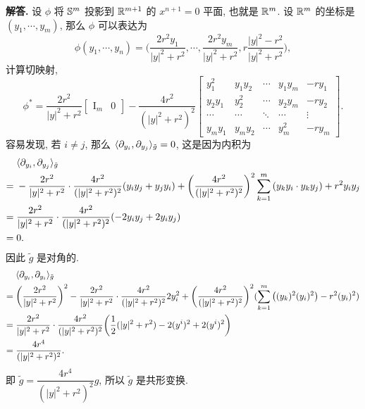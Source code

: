 \documentclass{ctexart}
\newenvironment{solution}{\par\noindent\textbf{解答. }}{\par}
\begin{document}
\begin{solution}
    设 $\phi$ 将 $\mathbb{S}^{m}$ 投影到 $\mathbb{R}^{m + 1}$ 的 $x^{n + 1} = 0$ 平面, 也就是 $\mathbb{R}^m$. 设 $\mathbb{R}^m$ 的坐标是 $(y_1, \cdots, y_m)$, 那么 $\phi$ 可以表达为
    \[
        \phi(y_1, \cdots, y_n) = \biggl( \dfrac{2r^2y_1}{|y|^2 + r^2}, \cdots, \dfrac{2r^2y_m}{|y|^2 + r^2}, r\dfrac{|y|^2 - r^2}{|y|^2 + r^2} \biggr),
    \]
    计算切映射,
    \newcommand{\rightpart}[1]{#1}
    \[
        \phi^{\ast} = \dfrac{2r^2}{|y|^2 + r^2}
        \begin{bmatrix}
            \mathrm{I}_{m} & 0
        \end{bmatrix}
        - \dfrac{4 r^2}{(|y|^2 + r^2)^2}
        \begin{bmatrix}
            \rightpart{y_1^2} & \rightpart{y_1y_2} & \cdots & \rightpart{y_1y_m} & -ry_1 \\
            \rightpart{y_2y_1} & \rightpart{y_2^2} & \cdots & \rightpart{y_2y_m} & -ry_2 \\
            \cdots & \cdots & \ddots & \cdots & \vdots \\
            \rightpart{y_my_1} & \rightpart{y_my_2} & \cdots & \rightpart{y_m^2} & -ry_m
        \end{bmatrix}.
    \]
    容易发现, 若 $i \not= j$, 那么 $\langle {\partial_{y_i}}, {\partial_{y_j}} \rangle_{\tilde{g}} = 0$, 这是因为内积为
    \[
        \begin{aligned}
             {} & \langle {\partial_{y_i}}, {\partial_{y_j}} \rangle_{\tilde{g}} \\
            ={} & -\dfrac{2r^2}{|y|^2 + r^2} \cdot \dfrac{4 r^2}{(|y|^2 + r^2)^2} (y_iy_j + y_jy_i) + \biggl(\dfrac{4 r^2}{(|y|^2 + r^2)^2} \biggr)^2 \sum_{k = 1}^{m} \left( y_k y_i \cdot y_k y_j \right) + r^2 y_i y_j \\
            ={} & \dfrac{2r^2}{|y|^2 + r^2} \cdot \dfrac{4 r^2}{(|y|^2 + r^2)^2}(-2y_i y_j + 2y_i y_j) \\
            ={} & 0.
        \end{aligned}
    \]
    因此 $\tilde{g}$ 是对角的. 
    \[
        \begin{aligned}
             {} & \langle {\partial_{y_i}}, {\partial_{y_i}} \rangle_{\tilde{g}} \\
            ={} & \biggl( \dfrac{2r^2}{|y|^2 + r^2} \biggr)^2 - \dfrac{2r^2}{|y|^2 + r^2} \cdot \dfrac{4 r^2}{(|y|^2 + r^2)^2} 2y_i^2
            + \biggl( \dfrac{4 r^2}{(|y|^2 + r^2)^2} \biggr)^2 (\sum_{k = 1}^{m} \left( (y_k)^2 (y_i)^2 \right) - r^2 (y_i)^2) \\
            ={} & \dfrac{2r^2}{|y|^2 + r^2} \cdot \dfrac{4 r^2}{(|y|^2 + r^2)^2} \biggl( \dfrac{1}{2}(|y|^2 + r^2) - 2(y^i)^2 + 2(y^i)^2 \biggr) \\
            ={} & \dfrac{4r^4}{(|y|^2 + r^2)^2}.
        \end{aligned}
    \]
    即 $\tilde{g} = \dfrac{4r^4}{(|y|^2 + r^2)^2}g$, 所以 $\tilde{g}$ 是共形变换.
\end{solution}
\end{document}
